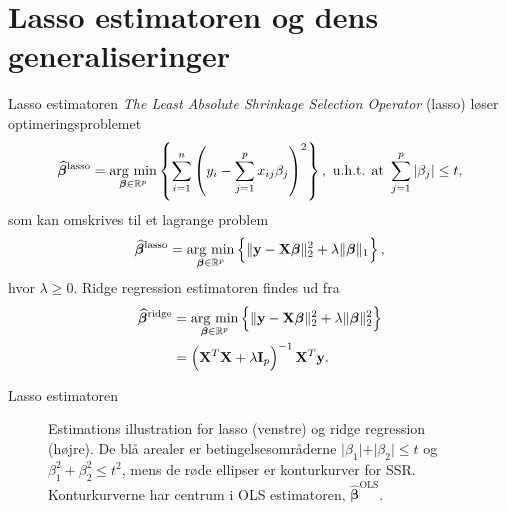 \section{Lasso estimatoren og dens generaliseringer}
\begin{frame}{Lasso estimatoren}
\textit{The Least Absolute Shrinkage Selection Operator} (lasso) løser optimeringsproblemet
\begin{align*}
\widehat{\boldsymbol{\beta}}^\text{lasso} = \argmin_{\boldsymbol{\beta} \in \R^p} \cbr{\sum_{i=1}^n \del{y_i - \sum_{j=1}^p x_{ij} \beta_j}^2}, \ \text{u.h.t. at } \sum_{j=1}^p \vert \beta_j \vert \leq t,
\end{align*} 
som kan omskrives til et lagrange problem
\begin{align*}
\widehat{\boldsymbol{\beta}}^\text{lasso} = \argmin_{\boldsymbol{\beta} \in \R^p} \cbr{ \Vert \mathbf{y} - \mathbf{X} \boldsymbol{\beta} \Vert_2^2 + \lambda \Vert \boldsymbol{\beta} \Vert_1},
\end{align*}
hvor \(\lambda \geq 0\).
Ridge regression estimatoren findes ud fra
\begin{align*}
\widehat{\boldsymbol{\beta}}^\text{ridge} &= \argmin_{\boldsymbol{\beta} \in \R^p} \cbr{ \Vert \mathbf{y} - \mathbf{X} \boldsymbol{\beta} \Vert_2^2 + \lambda \Vert \boldsymbol{\beta} \Vert_2^2} \\
&= \del{\mathbf{X}^T \mathbf{X} + \lambda \mathbf{I}_p}^{-1} \mathbf{X}^T \mathbf{y}.
\end{align*} 
\end{frame}

\begin{frame}{Lasso estimatoren}
\begin{figure}[H]
\centering
\begin{minipage}{0.4\linewidth}
\scalebox{0.6}{}
\end{minipage}
\hspace{0.2cm}
\begin{minipage}{0.4\linewidth}
\scalebox{0.6}{}
\end{minipage}
\caption{Estimations illustration for lasso (venstre) og ridge regression (højre). 
De blå arealer er betingelsesområderne $\vert \beta_1 \vert+\vert \beta_2 \vert \leq t$ og $\beta_1^2+\beta_2^2 \leq t^2$, mens de røde ellipser er konturkurver for SSR. Konturkurverne har centrum i OLS estimatoren, $\widehat{\boldsymbol{\beta}}^\text{OLS}$.}
\end{figure}
\end{frame}



